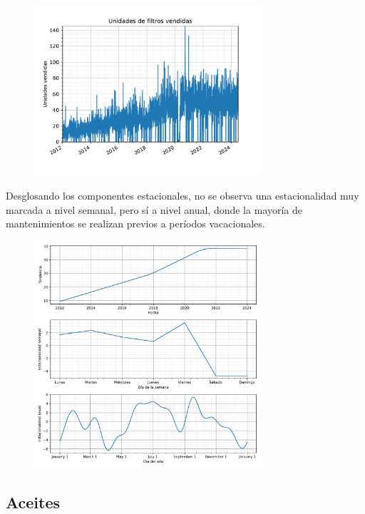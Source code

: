 \begin{figure}[H]
	{\includegraphics[width=0.75\textwidth]{imagenes/grafica_filtros.pdf}}
\end{figure}

Desglosando los componentes estacionales, no se observa una estacionalidad muy marcada a nivel semanal, pero sí a nivel anual, donde la mayoría de mantenimientos se realizan previos a períodos vacacionales.

\begin{figure}[H]
	{\includegraphics[width=0.75\textwidth]{imagenes/comps_filtros.pdf}}
\end{figure}

\subsection{Aceites}

